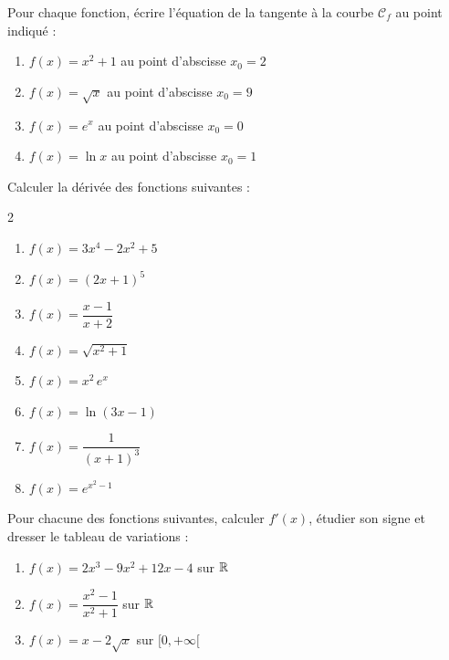 \begin{exercice}
  Pour chaque fonction, \'{e}crire l'\'{e}quation de la tangente
  \`{a} la courbe $\mathcal{C}_f$ au point indiqu\'{e} :
  \begin{enumerate}
    \item $f(x) = x^2 + 1$ \quad au point d'abscisse $x_0 = 2$
    \item $f(x) = \sqrt{x}$ \quad au point d'abscisse $x_0 = 9$
    \item $f(x) = e^x$ \quad au point d'abscisse $x_0 = 0$
    \item $f(x) = \ln x$ \quad au point d'abscisse $x_0 = 1$
  \end{enumerate}
\end{exercice}
\newpage
\begin{exercice}
  Calculer la d\'{e}riv\'{e}e des fonctions suivantes :
  \begin{multicols}{2}
  \begin{enumerate}
    \item $f(x) = 3x^4 - 2x^2 + 5$
    \item $f(x) = (2x+1)^5$
    \item $f(x) = \dfrac{x-1}{x+2}$
    \item $f(x) = \sqrt{x^2+1}$
    \item $f(x) = x^2\,e^x$
    \item $f(x) = \ln(3x-1)$
    \item $f(x) = \dfrac{1}{(x+1)^3}$
    \item $f(x) = e^{x^2-1}$
  \end{enumerate}
  \end{multicols}
\end{exercice}

\begin{exercice}
  Pour chacune des fonctions suivantes, calculer $f'(x)$,
  \'{e}tudier son signe et dresser le tableau de variations :
  \begin{enumerate}
    \item $f(x) = 2x^3 - 9x^2 + 12x - 4$ sur $\mathbb{R}$
    \item $f(x) = \dfrac{x^2 - 1}{x^2 + 1}$ sur $\mathbb{R}$
    \item $f(x) = x - 2\sqrt{x}$ sur $[0, +\infty[$
  \end{enumerate}
\end{exercice}

